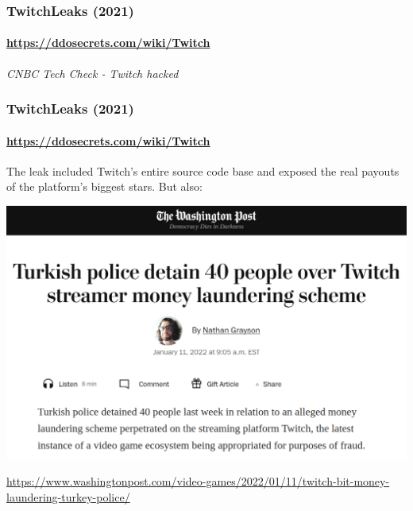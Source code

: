 \documentclass[aspectratio=169,usenames,dvipsnames]{beamer}
\begin{document}
\begin{frame}
  \frametitle{TwitchLeaks (2021)}
  \framesubtitle{\url{https://ddosecrets.com/wiki/Twitch}}

  \centering

  \footnotesize
  \emph{CNBC Tech Check - Twitch hacked}
\end{frame}

\begin{frame}
  \frametitle{TwitchLeaks (2021)}
  \framesubtitle{\url{https://ddosecrets.com/wiki/Twitch}}

  \footnotesize

  The leak included Twitch's entire source code base and exposed the real
  payouts of the platform's biggest stars. But also:\pause

  \vfill \centering
  \includegraphics[width=\textwidth,height=0.6\textheight,keepaspectratio]{img/twitch_leaks_turkey.png}

  \url{https://www.washingtonpost.com/video-games/2022/01/11/twitch-bit-money-laundering-turkey-police/}
\end{frame}
\end{document}
